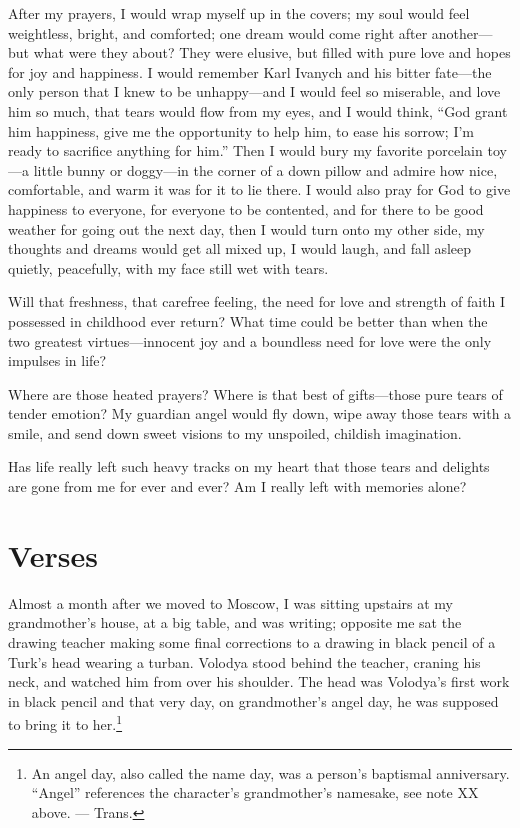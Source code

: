 After my prayers, I would wrap myself up in the covers; my soul would feel weightless, bright, and comforted; one dream would come right after another---but what were they about? They were elusive, but filled with pure love and hopes for joy and happiness. I would remember Karl Ivanych and his bitter fate---the only person that I knew to be unhappy---and I would feel so miserable, and love him so much, that tears would flow from my eyes, and I would think, ``God grant him happiness, give me the opportunity to help him, to ease his sorrow; I'm ready to sacrifice anything for him.'' Then I would bury my favorite porcelain toy---a little bunny or doggy---in the corner of a down pillow and admire how nice, comfortable, and warm it was for it to lie there. I would also pray for God to give happiness to everyone, for everyone to be contented, and for there to be good weather for going out the next day, then I would turn onto my other side, my thoughts and dreams would get all mixed up, I would laugh, and fall asleep quietly, peacefully, with my face still wet with tears.

Will that freshness, that carefree feeling, the need for love and strength of faith I possessed in childhood ever return? What time could be better than when the two greatest virtues---innocent joy and a boundless need for love were the only impulses in life?

Where are those heated prayers? Where is that best of gifts---those pure tears of tender emotion? My guardian angel would fly down, wipe away those tears with a smile, and send down sweet visions to my unspoiled, childish imagination.

Has life really left such heavy tracks on my heart that those tears and delights are gone from me for ever and ever? Am I really left with memories alone?

\chapter{Verses} %

Almost a month after we moved to Moscow, I was sitting upstairs at my grandmother's house, at a big table, and was writing; opposite me sat the drawing teacher making some final corrections to a drawing in black pencil of a Turk's head wearing a turban. Volodya stood behind the teacher, craning his neck, and watched him from over his shoulder. The head was Volodya's first work in black pencil and that very day, on grandmother's angel day, he was supposed to bring it to her.\footnote{An angel day, also called the name day, was a person's baptismal anniversary. ``Angel'' references the character's grandmother's namesake, see note XX above. --- Trans.} 

